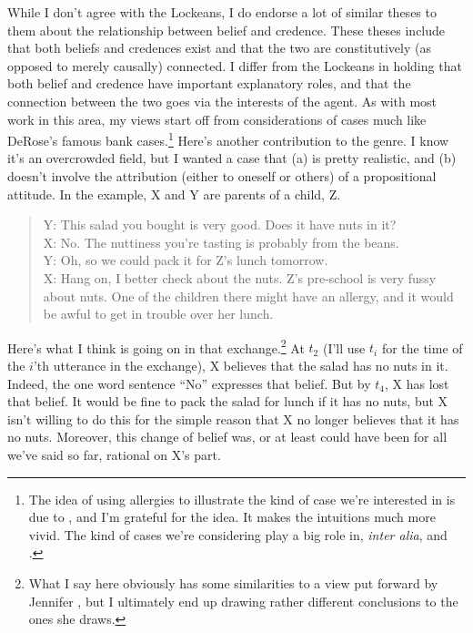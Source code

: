 While I don't agree with the Lockeans, I do endorse a lot of similar theses to them about the relationship between belief and credence. These theses include that both beliefs and credences exist and that the two are constitutively (as opposed to merely causally) connected. I differ from the Lockeans in holding that both belief and credence have important explanatory roles, and that the connection between the two goes via the interests of the agent. As with most work in this area, my views start off from considerations of cases much like DeRose's famous bank cases.\footnote{The idea of using allergies to illustrate the kind of case we're interested in is due to \citet{SchroederRoss2012}, and I'm grateful for the idea. It makes the intuitions much more vivid. The kind of cases we're considering play a big role in, \textit{inter alia}, \citet{DeRose1992, Cohen1999} and \citet{Fantl2002}.
} Here's another contribution to the genre. I know it's an overcrowded field, but I wanted a case that (a) is pretty realistic, and (b) doesn't involve the attribution (either to oneself or others) of a propositional attitude. In the example, X and Y are parents of a child, Z.

\begin{quote}
Y: This salad you bought is very good. Does it have nuts in it? \\
X: No. The nuttiness you're tasting is probably from the beans. \\
Y: Oh, so we could pack it for Z's lunch tomorrow.\\
X: Hang on, I better check about the nuts. Z's pre-school is very fussy about nuts. One of the children there might have an allergy, and it would be awful to get in trouble over her lunch.
\end{quote}

\noindent Here's what I think is going on in that exchange.\footnote{What I say here obviously has some similarities to a view put forward by Jennifer \citet{Nagel2008}, but I ultimately end up drawing rather different conclusions to the ones she draws.} At $t_2$ (I'll use $t_i$ for the time of the $i$'th utterance in the exchange), X believes that the salad has no nuts in it. Indeed, the one word sentence ``No'' expresses that belief. But by $t_4$, X has lost that belief. It would be fine to pack the salad for lunch if it has no nuts, but X isn't willing to do this for the simple reason that X no longer believes that it has no nuts. Moreover, this change of belief was, or at least could have been for all we've said so far, rational on X's part.

